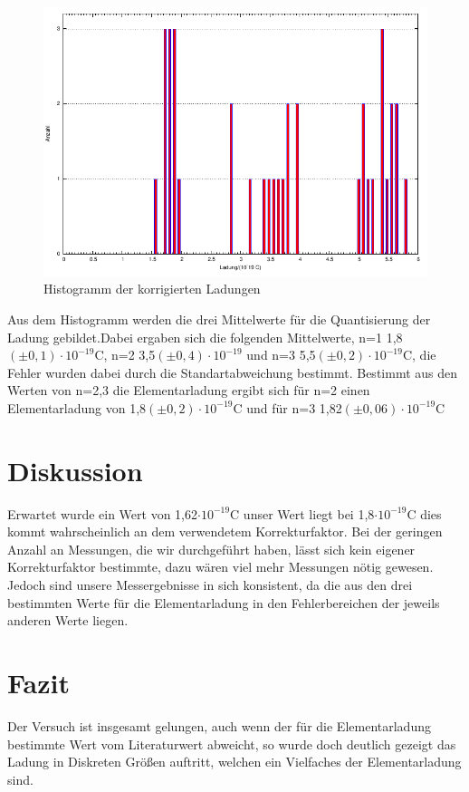 \documentclass[12pt]{scrartcl}
\begin{document}
\begin{figure}[H] 
  \centering
    \includegraphics[scale = 1.3]{messung.pdf}
  	\caption[Histogramm der korrigierten Ladungen]{Histogramm der korrigierten Ladungen}
  \label{fig:histogramm}
\end{figure}

Aus dem Histogramm werden die drei Mittelwerte für die Quantisierung der Ladung gebildet.Dabei ergaben sich die folgenden Mittelwerte, n=1 \hspace*{4px} 1,8$(\pm0,1)\cdot 10^{-19}$C, n=2 \hspace*{4px} 3,5$(\pm 0,4)\cdot 10^{-19}$ und n=3 \hspace*{4px} 5,5$(\pm 0,2)\cdot 10^{-19}$C, die Fehler wurden dabei durch die Standartabweichung bestimmt. Bestimmt aus den Werten von n=2,3 die Elementarladung ergibt sich für n=2 einen Elementarladung von 1,8$(\pm 0,2)\cdot 10^{-19}$C und für n=3 \hspace*{4px} 1,82$(\pm 0,06)\cdot 10^{-19}$C

\section{Diskussion}
Erwartet wurde ein Wert von 1,62$\cdot 10^{-19}$C unser Wert liegt bei 1,8$\cdot 10^{-19}$C dies kommt wahrscheinlich an dem verwendetem Korrekturfaktor. Bei der geringen Anzahl an Messungen, die wir durchgeführt haben, lässt sich kein eigener Korrekturfaktor bestimmte, dazu wären viel mehr Messungen nötig gewesen. Jedoch sind unsere Messergebnisse in sich konsistent, da die aus den drei bestimmten Werte für die Elementarladung in den Fehlerbereichen der jeweils anderen Werte liegen.

\section{Fazit}
Der Versuch ist insgesamt gelungen, auch wenn der für die Elementarladung bestimmte Wert vom Literaturwert abweicht, so wurde doch deutlich gezeigt das Ladung in Diskreten Größen auftritt, welchen ein Vielfaches der Elementarladung sind.
\end{document}
